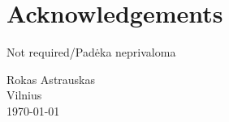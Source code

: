 {}

\chapter*{Acknowledgements}

Not required/Padėka neprivaloma


{\flushright  Rokas Astrauskas\\ Vilnius\\ \today\\ }
